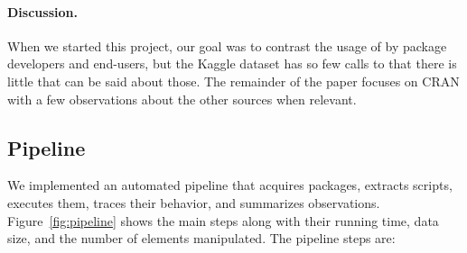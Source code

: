 \documentclass[acmsmall, screen]{acmart}
\begin{document}
\paragraph{Discussion.} When we started this project, our goal was to contrast the
usage of \eval by package developers and end-users, but the Kaggle dataset has
so few calls to \eval that there is little that can be said about those. The
remainder of the paper focuses on CRAN with a few observations about the other
sources when relevant.


\subsection{Pipeline}

We implemented an automated pipeline that acquires packages, extracts scripts,
executes them, traces their behavior, and summarizes observations.
Figure~\ref{fig:pipeline} shows the main steps along with their running time,
data size, and the number of elements manipulated. The pipeline steps are:
\end{document}
